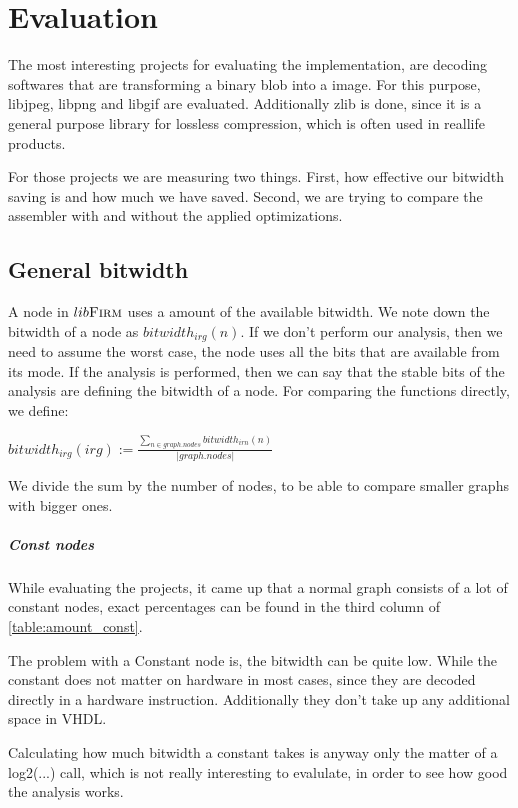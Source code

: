 \chapter{Evaluation}\label{sec:eval}

The most interesting projects for evaluating the implementation, are decoding softwares that are transforming a binary blob into a image. For this purpose, libjpeg, libpng and libgif are evaluated. Additionally zlib is done, since it is a general purpose library for lossless compression, which is often used in reallife products.

For those projects we are measuring two things. First, how effective our bitwidth saving is and how much we have saved. Second, we are trying to compare the assembler with and without the applied optimizations.

\section{General bitwidth}
A node in $lib\textsc{Firm}$ uses a amount of the available bitwidth. We note down the bitwidth of a node as $bitwidth_{irg}(n)$.
If we don't perform our analysis, then we need to assume the worst case, the node uses all the bits that are available from its mode.
If the analysis is performed, then we can say that the stable bits of the analysis are defining the bitwidth of a node.
For comparing the functions directly, we define:

$bitwidth_{irg}(irg) := \frac{\sum\nolimits_{n \in graph.nodes} bitwidth_{irn}(n)}{|graph.nodes|} $ 

We divide the sum by the number of nodes, to be able to compare smaller graphs with bigger ones. 

\paragraph{Const nodes}

While evaluating the projects, it came up that a normal graph consists of a lot of constant nodes, exact percentages can be found in the third column of  \autoref{table:amount_const}. 

The problem with a Constant node is, the bitwidth can be quite low. While the constant does not matter on hardware in most cases, since they are decoded directly in a hardware instruction. Additionally they don't take up any additional space in VHDL. 

Calculating how much bitwidth a constant takes is anyway only the matter of a log2(...) call, which is not really interesting to evalulate, in order to see how good the analysis works.

